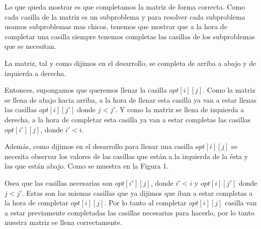 Lo que queda mostrar es que completamos la matriz de forma correcta. Como cada casilla de la matriz es un subproblema y para resolver cada subproblema usamos subproblemas mas chicos, tenemos que mostrar que a la hora de completar una casilla siempre tenemos completas las casillas de los subproblemas que se necesitan.

La matriz, tal y como dijimos en el desarrollo, se completa de arriba a abajo y de izquierda a derecha.

Entonces, supongamos que queremos llenar la casilla $opt[i][j]$. Como la matriz se llena de abajo hacia arriba, a la hora de llenar esta casilla ya van a estar llenas las casillas $opt[i][j']$ donde $j < j'$. Y como la matriz se llena de izquierda a derecha, a la hora de completar esta casilla ya van a estar completas las casillas $opt[i'][j]$, donde $i' < i$.

Además, como dijimos en el desarrollo para llenar una casilla $opt[i][j]$ se necesita observar los valores de las casillas que están a la izquierda de la ésta y las que están abajo. Como se muestra en la Figura 1.

Osea que las casillas necesarias son $opt[i'][j]$, donde $i' < i$ y $opt[i][j']$ donde $j < j'$. Estas son las mismas casillas que ya dijimos que iban a estar completas a la hora de completar $opt[i][j]$. Por lo tanto al completar $opt[i][j]$ casilla van a estar previamente completadas las casillas necesarias para hacerlo, por lo tanto nuestra matriz se llena correctamente.